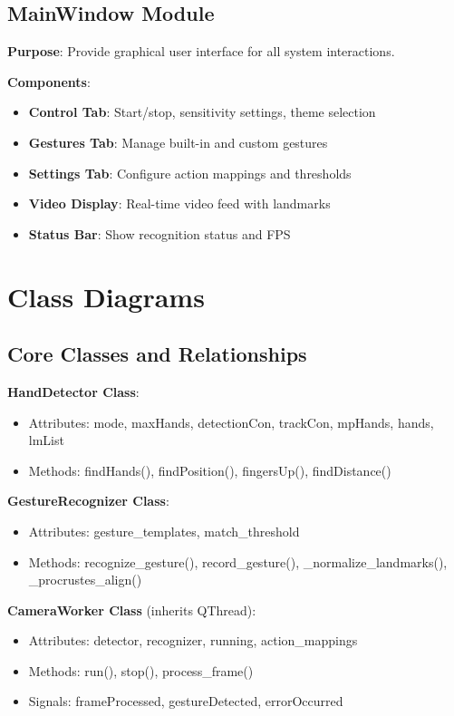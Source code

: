 \documentclass[12pt,a4paper]{report}
\begin{document}
\subsection{MainWindow Module}

\textbf{Purpose}: Provide graphical user interface for all system interactions.

\textbf{Components}:
\begin{itemize}
    \item \textbf{Control Tab}: Start/stop, sensitivity settings, theme selection
    \item \textbf{Gestures Tab}: Manage built-in and custom gestures
    \item \textbf{Settings Tab}: Configure action mappings and thresholds
    \item \textbf{Video Display}: Real-time video feed with landmarks
    \item \textbf{Status Bar}: Show recognition status and FPS
\end{itemize}

\section{Class Diagrams}

\subsection{Core Classes and Relationships}

\textbf{HandDetector Class}:
\begin{itemize}
    \item Attributes: mode, maxHands, detectionCon, trackCon, mpHands, hands, lmList
    \item Methods: findHands(), findPosition(), fingersUp(), findDistance()
\end{itemize}

\textbf{GestureRecognizer Class}:
\begin{itemize}
    \item Attributes: gesture\_templates, match\_threshold
    \item Methods: recognize\_gesture(), record\_gesture(), \_normalize\_landmarks(), \_procrustes\_align()
\end{itemize}

\textbf{CameraWorker Class} (inherits QThread):
\begin{itemize}
    \item Attributes: detector, recognizer, running, action\_mappings
    \item Methods: run(), stop(), process\_frame()
    \item Signals: frameProcessed, gestureDetected, errorOccurred
\end{itemize}
\end{document}
